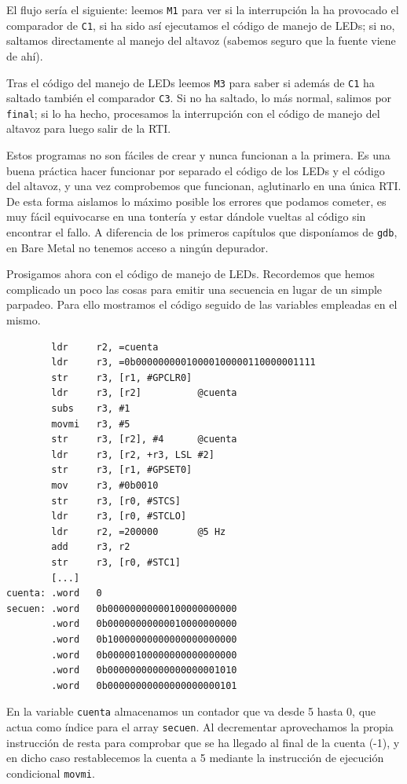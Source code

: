 El flujo sería el siguiente: leemos {\tt M1} para ver si la interrupción la ha provocado el
comparador de {\tt C1}, si ha sido así ejecutamos el código de manejo de LEDs; si no,
saltamos directamente al manejo del altavoz (sabemos seguro que la fuente viene de ahí).

Tras el código del manejo de LEDs leemos {\tt M3} para saber si además de {\tt C1} ha
saltado también el comparador {\tt C3}. Si no ha saltado, lo más normal, salimos por
{\tt final}; si lo ha hecho, procesamos la interrupción con el código de manejo del altavoz
para luego salir de la RTI.

Estos programas no son fáciles de crear y nunca funcionan a la primera. Es una buena práctica
hacer funcionar por separado el código de los LEDs y el código del altavoz, y una vez
comprobemos que funcionan, aglutinarlo en una única RTI. De esta forma aislamos lo máximo
posible los errores que podamos cometer, es muy fácil equivocarse en una tontería y estar
dándole vueltas al código sin encontrar el fallo. A diferencia de los primeros capítulos
que disponíamos de {\tt gdb}, en Bare Metal no tenemos acceso a ningún depurador.

Prosigamos ahora con el código de manejo de LEDs. Recordemos que hemos complicado un poco
las cosas para emitir una secuencia en lugar de un simple parpadeo. Para ello mostramos
el código seguido de las variables empleadas en el mismo.

\begin{lstlisting}
        ldr     r2, =cuenta
        ldr     r3, =0b00000000010000100000110000001111
        str     r3, [r1, #GPCLR0]
        ldr     r3, [r2]          @cuenta
        subs    r3, #1
        movmi   r3, #5
        str     r3, [r2], #4      @cuenta
        ldr     r3, [r2, +r3, LSL #2]
        str     r3, [r1, #GPSET0]
        mov     r3, #0b0010
        str     r3, [r0, #STCS]
        ldr     r3, [r0, #STCLO]
        ldr     r2, =200000       @5 Hz
        add     r3, r2
        str     r3, [r0, #STC1]
        [...]
cuenta: .word   0
secuen: .word   0b00000000000100000000000
        .word   0b00000000000010000000000
        .word   0b10000000000000000000000
        .word   0b00000100000000000000000
        .word   0b00000000000000000001010
        .word   0b00000000000000000000101
\end{lstlisting}

En la variable {\tt cuenta} almacenamos un contador que va desde 5 hasta 0, que actua
como índice para el array {\tt secuen}. Al decrementar aprovechamos la propia instrucción de
resta para comprobar que se ha llegado al final de la cuenta (-1), y en dicho caso
restablecemos la cuenta a 5 mediante la instrucción de ejecución condicional {\tt movmi}.

